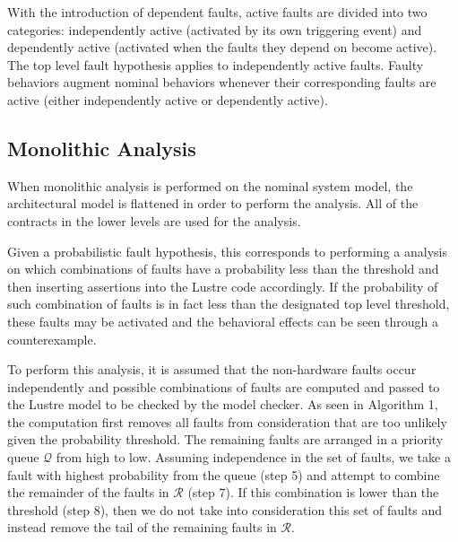 With the introduction of dependent faults, active faults are divided into two categories: independently active (activated by its own triggering event) and dependently active (activated when the faults they depend on become active). The top level fault hypothesis applies to independently active faults. Faulty behaviors augment nominal behaviors whenever their corresponding faults are active (either independently active or dependently active).

\subsection{Monolithic Analysis}
When monolithic analysis is performed on the nominal system model, the architectural model is flattened in order to perform the analysis. All of the contracts in the lower levels are used for the analysis.

Given a probabilistic fault hypothesis, this corresponds to performing a %
analysis on which combinations of faults have a probability less than the threshold and then inserting assertions into the Lustre code accordingly. If the probability of such combination of faults is in fact less than the designated top level threshold, these faults may be activated and the behavioral effects can be seen through a counterexample.  

To perform this analysis, it is assumed that the non-hardware faults occur independently and possible combinations of faults are computed and passed to the Lustre model to be checked by the model checker. As seen in Algorithm 1, the computation first removes all faults from consideration that are too unlikely given the probability threshold. The remaining faults are arranged in a priority queue $\mathcal{Q}$ from high to low. Assuming independence in the set of faults, we take a fault with highest probability from the queue (step 5) and attempt to combine the remainder of the faults in $\mathcal{R}$ (step 7). If this combination is lower than the threshold (step 8), then we do not take into consideration this set of faults and instead remove the tail of the remaining faults in $\mathcal{R}$. %
 

